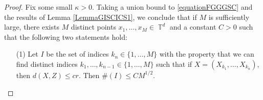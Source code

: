 \documentclass[dvipsnames,letterpaper,12pt]{article}
\numberwithin{equation}{section}
\DeclareMathOperator{\TT}{\mathbb{T}}
\numberwithin{theorem}{section}
\DeclareMathOperator{\PP}{\mathbb{P}}
\begin{document}
\begin{proof}
    Fix some small $\kappa > 0$. Taking a union bound to \eqref{equationFGGGSC} %
    and the results of Lemma \ref{LemmaGISCICS1}, we conclude that if $M$ is sufficiently large, there exists $M$ distinct points $x_1, \dots, x_M \in \TT^d$ and a constant $C > 0$ such that the following two statements hold:
    \begin{itemize}
        \item[(1)] Let $I$ be the set of indices $k_n \in \{ 1, \dots, M \}$ with the property that we can find distinct indices $k_1, \dots, k_{n-1} \in \{ 1, \dots, M \}$ such that if $X = (X_{k_1}, \dots, X_{k_n})$, then $d(X,Z) \leq cr$. Then $\#(I) \leq C M^{1/2}$.


\end{itemize}
\end{proof}
\end{document}
